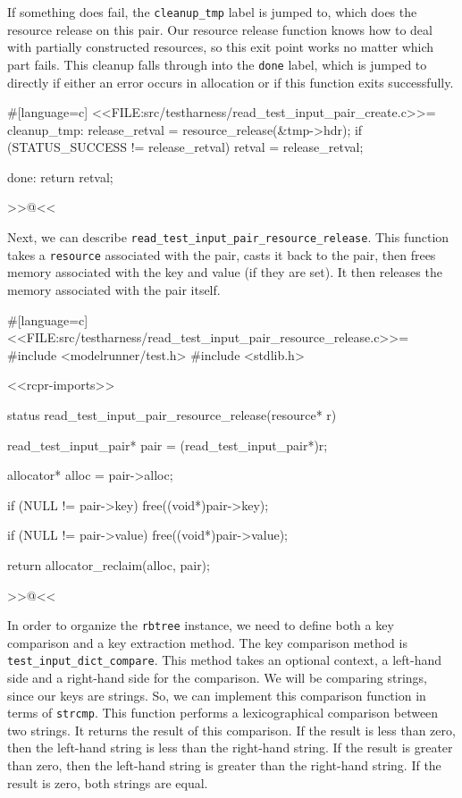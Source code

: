 {{If something does fail, the \verb/cleanup_tmp/ label is jumped to, which does
the resource release on this pair. Our resource release function knows how to
deal with partially constructed resources, so this exit point works no matter
which part fails.  This cleanup falls through into the \verb/done/ label, which
is jumped to directly if either an error occurs in allocation or if this
function exits successfully.

#[language=c]
<<FILE:src/testharness/read_test_input_pair_create.c>>=
cleanup_tmp:
    release_retval = resource_release(&tmp->hdr);
    if (STATUS_SUCCESS != release_retval)
    {
        retval = release_retval;
    }

done:
    return retval;
}
>>@<<

\newpage

Next, we can describe \verb/read_test_input_pair_resource_release/. This
function takes a \verb/resource/ associated with the pair, casts it back to the
pair, then frees memory associated with the key and value (if they are set). It
then releases the memory associated with the pair itself.

#[language=c]
<<FILE:src/testharness/read_test_input_pair_resource_release.c>>=
#include <modelrunner/test.h>
#include <stdlib.h>

<<rcpr-imports>>

status read_test_input_pair_resource_release(resource* r)
{
    read_test_input_pair* pair = (read_test_input_pair*)r;

    allocator* alloc = pair->alloc;

    if (NULL != pair->key)
    {
        free((void*)pair->key);
    }

    if (NULL != pair->value)
    {
        free((void*)pair->value);
    }

    return allocator_reclaim(alloc, pair);
}
>>@<<

In order to organize the \verb/rbtree/ instance, we need to define both a key
comparison and a key extraction method. The key comparison method is
\verb/test_input_dict_compare/. This method takes an optional context, a
left-hand side and a right-hand side for the comparison. We will be comparing
strings, since our keys are strings. So, we can implement this comparison
function in terms of \verb/strcmp/. This function performs a lexicographical
comparison between two strings. It returns the result of this comparison. If the
result is less than zero, then the left-hand string is less than the right-hand
string.  If the result is greater than zero, then the left-hand string is
greater than the right-hand string. If the result is zero, both strings are
equal.

}
